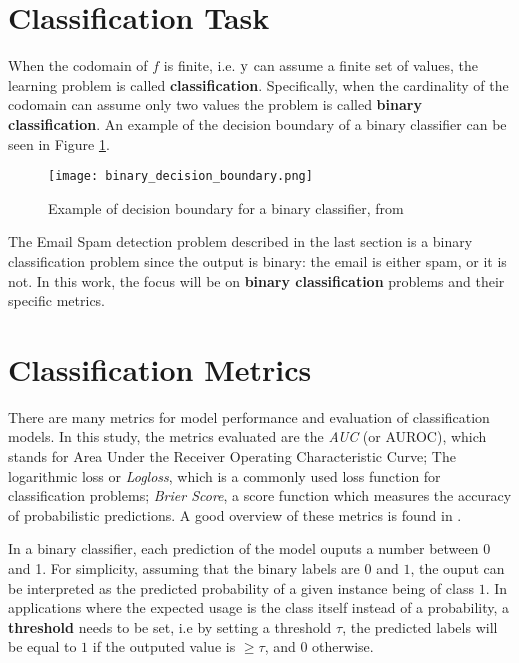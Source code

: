 \section{Classification Task}

When the codomain of $f$ is finite, i.e. $\text{\textup{y}}$ can assume a finite set of values, the learning problem is called \textbf{classification}. Specifically, when the cardinality of the codomain can assume only two values the problem is called \textbf{binary classification}. An example of the decision boundary of a binary classifier can be seen in Figure \ref{fig:binaryclassifier}.

\begin{figure}[H]
    \centering
    \texttt{[image: binary\_decision\_boundary.png]} 
    \caption{Example of decision boundary for a binary classifier, from \cite{hastie2009elements}}
    \label{fig:binaryclassifier}
\end{figure}

The Email Spam detection problem described in the last section is a binary classification problem since the output is binary: the email is either spam, or it is not. In this work, the focus will be on \textbf{binary classification} problems and their specific metrics.

\section{Classification Metrics}
\label{classification-metrics}

There are many metrics for model performance and evaluation of classification models. In this study, the metrics evaluated are the \textit{AUC} (or AUROC), which stands for Area Under the Receiver Operating Characteristic Curve; The logarithmic loss or \textit{Logloss}, which is a commonly used loss function for classification problems; \textit{Brier Score}, a score function which measures the accuracy of probabilistic predictions. A good overview of these metrics is found in \cite{kuhn2013applied}.

In a binary classifier, each prediction of the model ouputs a number between 0 and 1. For simplicity, assuming that the binary labels are $0$ and $1$, the ouput can be interpreted as the predicted probability of a given instance being of class $1$. In applications where the expected usage is the class itself instead of a probability, a \textbf{threshold} needs to be set, i.e by setting a threshold $\tau$, the predicted labels will be equal to $1$ if the outputed value is $ \geq \tau$, and $0$ otherwise.

